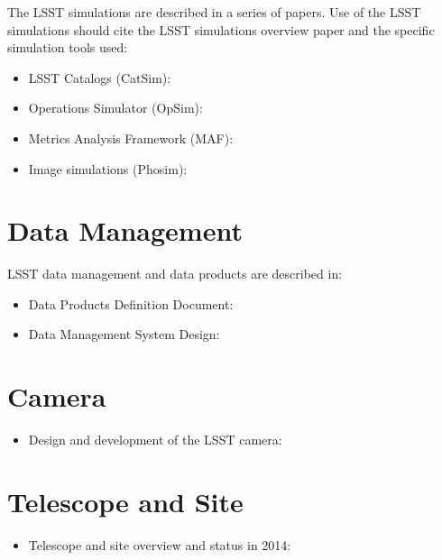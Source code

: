 \documentclass[12pt]{article}
\begin{document}
The LSST simulations are described in a series of papers. Use of the LSST simulations should cite the LSST simulations overview paper \cite{2014SPIE.9150E..14C} and the specific simulation tools used:

\begin{itemize}
\item LSST Catalogs (CatSim): \cite{2014SPIE.9150E..14C}
\item Operations Simulator (OpSim): \cite{2014SPIE.9150E..15D}
\item Metrics Analysis Framework (MAF): \cite{2014SPIE.9149E..0BJ}
\item Image simulations (Phosim): \cite{0067-0049-218-1-14}
\end{itemize}


\section{Data Management}

LSST data management and data products are described in: 

\begin{itemize}
  \item Data Products Definition Document: \cite{DPDD}
  \item Data Management System Design: \cite{DMDesign}
\end{itemize}


\section{Camera}

\begin{itemize}
   \item Design and development of the LSST camera: \cite{2010SPIE.7735E..0JK}
\end{itemize}


\section{Telescope and Site}

\begin{itemize}
   \item Telescope and site overview and status in 2014:  \cite{2014SPIE.9145E..1AG}
\end{itemize}
\end{document}

